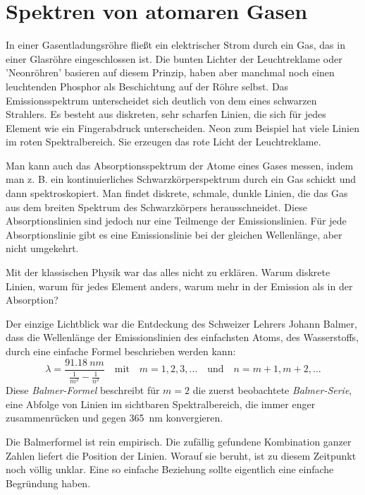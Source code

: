 \section{Spektren von atomaren Gasen}

In einer Gasentladungsröhre fließt ein elektrischer Strom durch ein Gas, das in einer Glasröhre eingeschlossen ist. Die bunten Lichter der Leuchtreklame oder 'Neonröhren' basieren auf diesem Prinzip, haben aber manchmal noch einen leuchtenden Phosphor als Beschichtung auf der Röhre selbst. Das Emissionsspektrum unterscheidet sich deutlich von dem eines schwarzen Strahlers. Es besteht aus diskreten, sehr scharfen Linien, die sich für jedes Element wie ein Fingerabdruck unterscheiden. Neon zum Beispiel hat viele Linien im roten Spektralbereich. Sie erzeugen das rote Licht der Leuchtreklame.

Man kann auch das Absorptionsspektrum der Atome eines Gases messen, indem man z. B. ein kontinuierliches Schwarzkörperspektrum durch ein Gas schickt und dann spektroskopiert. Man findet diskrete, schmale, dunkle Linien, die das Gas aus dem breiten Spektrum des Schwarzkörpers herausschneidet. Diese Absorptionslinien sind jedoch nur eine Teilmenge der Emissionslinien. Für jede Absorptionslinie gibt es eine Emissionslinie bei der gleichen Wellenlänge, aber nicht umgekehrt.

Mit der klassischen Physik war das alles nicht zu erklären. Warum diskrete Linien, warum für jedes Element anders, warum mehr in der Emission als in der Absorption?

Der einzige Lichtblick war die Entdeckung des Schweizer Lehrers Johann Balmer, dass die Wellenlänge der Emissionslinien des einfachsten Atoms, des Wasserstoffs, durch eine einfache Formel beschrieben werden kann:
\begin{equation}
    \lambda = \frac{\SI{91.18}{nm}}{ 
       \frac{1}{m^2} - \frac{1}{n^2} 
    }
    \quad \text{mit} \quad m = 1,2, 3, \dots \quad \text{und} \quad n = m+1, m+2, \dots
\end{equation}
Diese \emph{Balmer-Formel} beschreibt für $m=2$ die zuerst beobachtete \emph{Balmer-Serie}, eine Abfolge von Linien im sichtbaren Spektralbereich, die immer enger zusammenrücken und gegen 365~nm konvergieren.  

Die Balmerformel ist rein empirisch. Die zufällig gefundene Kombination ganzer Zahlen liefert die Position der Linien. Worauf sie beruht, ist zu diesem Zeitpunkt noch völlig unklar. Eine so einfache Beziehung sollte eigentlich eine einfache Begründung haben.


